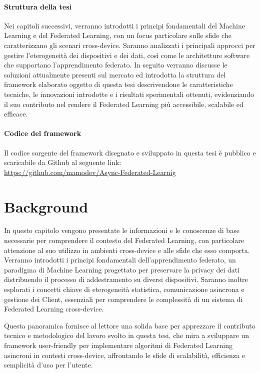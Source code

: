 \documentclass[a4paper, oneside, openright]{report}
\begin{document}
\subsubsection*{Struttura della tesi}
Nei capitoli successivi, verranno introdotti i principi fondamentali del Machine Learning e del Federated Learning, con un focus particolare sulle sfide che caratterizzano gli scenari cross-device. Saranno analizzati i principali approcci per gestire l'eterogeneità dei dispositivi e dei dati, così come le architetture software che supportano l'apprendimento federato. In seguito verranno discusse le soluzioni attualmente presenti sul mercato ed introdotta la struttura del framework elaborato oggetto di questa tesi descrivendone le caratteristiche tecniche, le innovazioni introdotte e i risultati sperimentali ottenuti, evidenziando il suo contributo nel rendere il Federated Learning più accessibile, scalabile ed efficace. 

\subsubsection*{Codice del framework}
Il codice sorgente del framework disegnato e sviluppato in questa tesi è pubblico e scaricabile da Github al seguente link: \\
\href{https://github.com/mamodev/Async-Federated-Learnig}{https://github.com/mamodev/Async-Federated-Learnig}
\clearpage{}
\clearpage{}\chapter{Background}\label{background}

In questo capitolo vengono presentate le informazioni e le conoscenze di base necessarie per comprendere il contesto del Federated Learning, con particolare attenzione al suo utilizzo in ambienti cross-device e alle sfide che esso comporta. Verranno introdotti i principi fondamentali dell’apprendimento federato, un paradigma di Machine Learning progettato per preservare la privacy dei dati distribuendo il processo di addestramento su diversi dispositivi. Saranno inoltre esplorati i concetti chiave di eterogeneità statistica, comunicazione asincrona e gestione dei Client, essenziali per comprendere le complessità di un sistema di Federated Learning cross-device.

Questa panoramica fornisce al lettore una solida base per apprezzare il contributo tecnico e metodologico del lavoro svolto in questa tesi, che mira a sviluppare un framework user-friendly per implementare algoritmi di Federated Learning asincroni in contesti cross-device, affrontando le sfide di scalabilità, efficienza e semplicità d’uso per l'utente.
\end{document}

